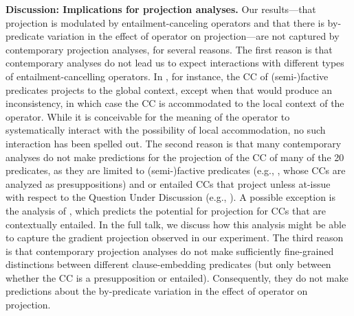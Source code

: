 \documentclass[12pt, a4paper]{article}
\begin{document}
	

\noindent
{\bf Discussion:  Implications for projection analyses.}
	Our results---that projection is modulated by entailment-canceling operators and that there is by-predicate variation in the effect of operator on projection---are not captured by contemporary projection analyses, for several reasons.
	The first reason is that contemporary analyses do not lead us to expect interactions with different types of entailment-cancelling operators. In \citealt{heim_projection_1983}, for instance, the CC of (semi-)factive predicates projects to the global context, except when that would produce an inconsistency, in which case the CC is accommodated to the local context of the operator. While it is conceivable for the meaning of the operator to systematically interact with the possibility of local accommodation, no such interaction has been spelled out.
	The second reason is that many contemporary analyses do not make predictions for the projection of the CC of many of the 20 predicates, as they are limited to (semi-)factive predicates (e.g., \citealt{heim_projection_1983,van_der_sandt_presupposition_1992}, whose CCs are analyzed as presuppositions) and or entailed CCs that project unless at-issue with respect to the Question Under Discussion (e.g., \citealt{abrusan_predicting_2011,simons_best_2017}). A possible exception is the analysis of \citealt{schlenker_triggering_2021}, which predicts the potential for projection for CCs that are contextually entailed. In the full talk, we discuss how this analysis might be able to capture the gradient projection observed in our experiment.
	The third reason is that contemporary projection analyses do not make sufficiently fine-grained distinctions between different clause-embedding predicates (but only between whether the CC is a presupposition or entailed). Consequently, they do not make predictions about the by-predicate variation in the effect of operator on projection.
\end{document}
